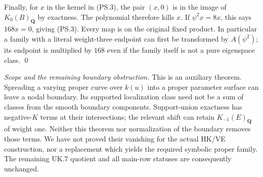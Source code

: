 Finally, for $x$ in the kernel in (PS.3), the pair $(x,0)$
is in the image of $K_0(B)_{\mathbf Q}$ by exactness.
The polynomial therefore kills $x$. If $\psi^2x=8x$,
this says $168x=0$, giving (PS.3). Every map is on the
original fixed product. In particular a family with a
literal weight-three endpoint can first be transformed
by $A(\psi^2)$; its endpoint is multiplied by $168$ even
if the family itself is not a pure eigenspace class.
\qed

\emph{Scope and the remaining boundary obstruction.}
This is an auxiliary theorem. Spreading a varying
proper curve over $k(u)$ into a proper parameter surface
can leave a nodal boundary. Its supported localization
class need not be a sum of classes from the smooth
boundary components. Support-union exactness has
negative-$K$ terms at their intersections; the relevant
shift can retain $K_{-1}(E)_{\mathbf Q}$ of weight one.
Neither this theorem nor normalization of the boundary
removes those terms. We have not proved their vanishing
for the actual HK/VE construction, nor a replacement
which yields the required symbolic proper family.
The remaining UK.7 quotient and all main-row statuses
are consequently unchanged.
